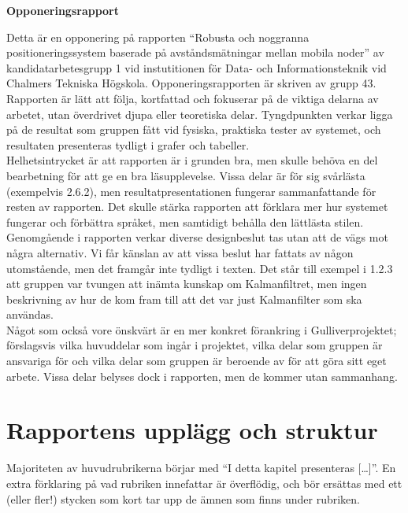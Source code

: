 \documentclass[a4paper,11pt]{article}
\begin{document}
\begin{center}
{\noindent \LARGE {\bf Opponeringsrapport}}\\
\end{center}

Detta är en opponering på rapporten “Robusta och noggranna positioneringssystem baserade på avståndsmätningar mellan mobila noder” av kandidatarbetesgrupp 1 vid instutitionen för Data- och Informationsteknik vid Chalmers Tekniska Högskola. Opponeringsrapporten är skriven av grupp 43. \\

Rapporten är lätt att följa, kortfattad och fokuserar på de viktiga delarna av arbetet, utan överdrivet djupa eller teoretiska delar. Tyngdpunkten verkar ligga på de resultat som gruppen fått vid fysiska, praktiska tester av systemet, och resultaten presenteras tydligt i grafer och tabeller. \\

Helhetsintrycket är att rapporten är i grunden bra, men skulle behöva en del bearbetning för att ge en bra läsupplevelse. Vissa delar är för sig svårlästa (exempelvis 2.6.2), men resultatpresentationen fungerar sammanfattande för resten av rapporten. Det skulle stärka rapporten att förklara mer hur systemet fungerar och förbättra språket, men samtidigt behålla den lättlästa stilen. \\

Genomgående i rapporten verkar diverse designbeslut tas utan att de vägs mot några alternativ. Vi får känslan av att vissa beslut har fattats av någon utomstående, men det framgår inte tydligt i texten. Det står till exempel i 1.2.3 att gruppen var tvungen att inämta kunskap om Kalmanfiltret, men ingen beskrivning av hur de kom fram till att det var just Kalmanfilter som ska användas. \\

Något som också vore önskvärt är en mer konkret förankring i Gulliverprojektet; förslagsvis vilka huvuddelar som ingår i projektet, vilka delar som gruppen är ansvariga för och vilka delar som gruppen är beroende av för att göra sitt eget arbete. Vissa delar belyses dock i rapporten, men de kommer utan sammanhang. \\

\section{Rapportens upplägg och struktur}
Majoriteten av huvudrubrikerna börjar med “I detta kapitel presenteras […]”. En extra förklaring på vad rubriken innefattar är överflödig, och bör ersättas med ett (eller fler!) stycken som kort tar upp de ämnen som finns under rubriken.\\
\end{document}
